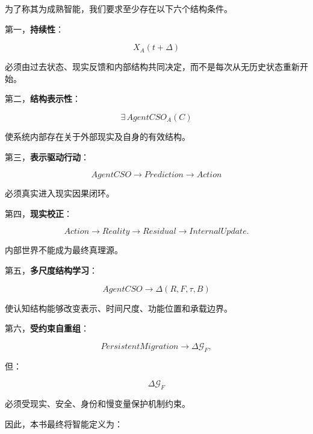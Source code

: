 为了称其为成熟智能，我们要求至少存在以下六个结构条件。

第一，\textbf{持续性}：

\[
X_A(t+\Delta)
\]

必须由过去状态、现实反馈和内部结构共同决定，而不是每次从无历史状态重新开始。

第二，\textbf{结构表示性}：

\[
\exists\,
AgentCSO_A(C)
\]

使系统内部存在关于外部现实及自身的有效结构。

第三，\textbf{表示驱动行动}：

\[
AgentCSO
\rightarrow
Prediction
\rightarrow
Action
\]

必须真实进入现实因果闭环。

第四，\textbf{现实校正}：

\[
Action
\rightarrow
Reality
\rightarrow
Residual
\rightarrow
InternalUpdate.
\]

内部世界不能成为最终真理源。

第五，\textbf{多尺度结构学习}：

\[
AgentCSO
\rightarrow
\Delta(R,F,\tau,B)
\]

使认知结构能够改变表示、时间尺度、功能位置和承载边界。

第六，\textbf{受约束自重组}：

\[
PersistentMigration
\rightarrow
\Delta\mathcal G_F,
\]

但：

\[
\Delta\mathcal G_F
\]

必须受现实、安全、身份和慢变量保护机制约束。

因此，本书最终将智能定义为：

\begin{statementbox}
\centering
{}
\end{statementbox}


